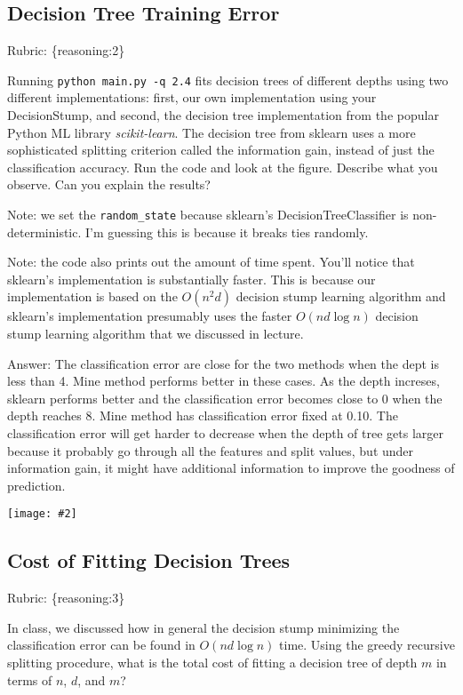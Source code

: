 \documentclass{article}
\def\blu#1{{\color{blu}#1}}
\def\gre#1{{\color{gre}#1}}
\newcommand{\fig}[2]{\texttt{[image: \#2]}}
\def\rubric#1{\gre{Rubric: \{#1\}}}{}
\begin{document}
\subsection{Decision Tree Training Error}
\rubric{reasoning:2}

Running \texttt{python main.py -q 2.4} fits decision trees of different depths using two different implementations: first,
our own implementation using your DecisionStump, and second, the decision tree implementation from the popular Python ML library \emph{scikit-learn}.
The decision tree from sklearn uses a more sophisticated splitting criterion called the information gain, instead of just the classification accuracy.
Run the code and look at the figure.
\blu{Describe what you observe. Can you explain the results?}

Note: we set the \verb|random_state| because sklearn's DecisionTreeClassifier is non-deterministic. I'm guessing this is
because it breaks ties randomly.

Note: the code also prints out the amount of time spent. You'll notice that sklearn's implementation is substantially faster. This is because
our implementation is based on the $O(n^2d)$ decision stump learning algorithm and sklearn's implementation presumably uses the faster $O(nd\log n)$
decision stump learning algorithm that we discussed in lecture.

Answer: The classification error are close for the two methods when the dept is less than 4. Mine method performs better in these cases. As the depth increses, sklearn performs better and the classification error becomes close to 0 when the depth reaches 8. Mine method has classification error fixed at 0.10. The classification error will get harder to decrease when the depth of tree gets larger because it probably go through all the features and split values, but under information gain, it might have additional information to improve the goodness of prediction.

\fig{0.5}{../figs/q2_4_tree_errors}


\subsection{Cost of Fitting Decision Trees}
\rubric{reasoning:3}

In class, we discussed how in general the decision stump minimizing the classification error can be found in $O(nd\log n)$ time.
Using the greedy recursive splitting procedure, \blu{what is the total cost of fitting a decision tree of depth $m$ in terms of $n$, $d$, and $m$?}
\end{document}
